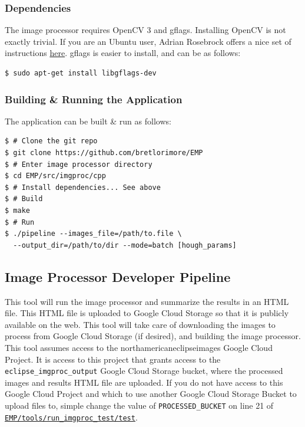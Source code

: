 \documentclass[10pt, onecolumn, draftclsnofoot, letterpaper, compsoc]{IEEEtran}
\begin{document}
\subsubsection{Dependencies}

The image processor requires OpenCV 3 and gflags. Installing OpenCV is not exactly trivial.
If you are an Ubuntu user, Adrian Rosebrock offers a nice set of instructions
\href{http://www.pyimagesearch.com/2016/10/24/ubuntu-16-04-how-to-install-opencv/}{here}.
gflags is easier to install, and can be as follows: \\

\begin{verbatim}
$ sudo apt-get install libgflags-dev
\end{verbatim}

\subsubsection{Building \& Running the Application}

The application can be built \& run as follows:

\begin{verbatim}
$ # Clone the git repo
$ git clone https://github.com/bretlorimore/EMP
$ # Enter image processor directory
$ cd EMP/src/imgproc/cpp
$ # Install dependencies... See above
$ # Build
$ make
$ # Run
$ ./pipeline --images_file=/path/to.file \
  --output_dir=/path/to/dir --mode=batch [hough_params]
\end{verbatim}

\subsection{Image Processor Developer Pipeline}

This tool will run the image processor and summarize the results in an HTML file.
This HTML file is uploaded to Google Cloud Storage so that it is publicly
available on the web. This tool will take care of downloading the images to process
from Google Cloud Storage (if desired), and building the image processor. This tool
assumes access to the northamericaneclipseimages Google Cloud Project. It is access
to this project that grants access to the \texttt{eclipse\_imgproc\_output}
Google Cloud Storage bucket, where the processed images and results HTML file are uploaded.
If you do not have access to this Google Cloud Project and which to use another
Google Cloud Storage Bucket to upload files to, simple change the value of
\texttt{PROCESSED\_BUCKET} on line 21 of
\href{https://github.com/bretlorimore/EMP/blob/master/tools/run_imgproc_test/test}{\texttt{EMP/tools/run\_imgproc\_test/test}}.
\end{document}
